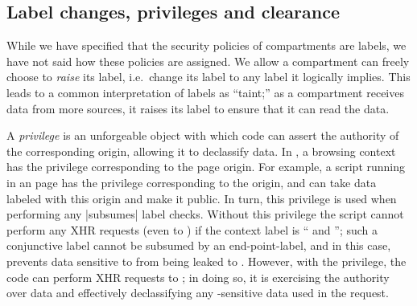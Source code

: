 
%
%

\subsection{Label changes, privileges and clearance}

While we have specified that the security policies of compartments
are labels, we have not said how these policies are assigned.
%
We allow a compartment can freely choose to \emph{raise} its label,
i.e.\ change its label to any label it logically implies.
%
This leads to a common interpretation of labels as ``taint;'' as
a compartment receives data from more sources, it raises its label
to ensure that it can read the data.

%
A \emph{privilege} is an unforgeable object with which code can assert the
authority of the corresponding origin, allowing it to declassify
data.
%
In \sys, a browsing context has the privilege corresponding to the
page origin.
%
For example, a script running in an  page has the
privilege corresponding to the  origin, and
can take data labeled with this origin and make it public.
%
In turn, this privilege is used when performing any \js|subsumes|
label checks.
%
Without this privilege the script cannot perform any XHR requests
(even to ) if the context label is
`` and '';
such a conjunctive label cannot be subsumed by an end-point-label, and
in this case, prevents data sensitive to 
from being leaked to .
%
However, with the   privilege, the code can perform
XHR requests to ; in doing so, it is exercising the
authority over  data and effectively declassifying
any -sensitive data used in the request.
 
